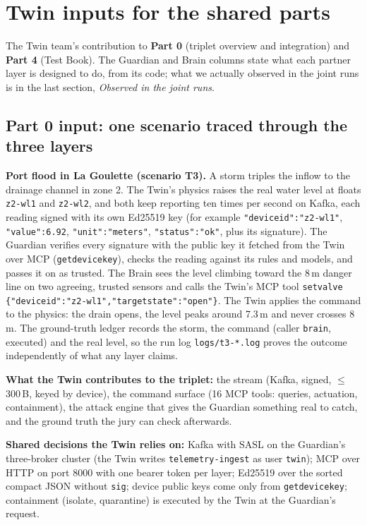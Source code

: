 \documentclass[10pt,a4paper]{article}
\renewcommand{\_}{\textunderscore\allowbreak}
\begin{document}
\section*{Twin inputs for the shared parts}
The Twin team's contribution to \textbf{Part 0} (triplet overview and integration) and \textbf{Part 4} (Test Book). The Guardian and Brain columns state what each partner layer is designed to do, from its code; what we actually observed in the joint runs is in the last section, \emph{Observed in the joint runs}.

\subsection*{Part 0 input: one scenario traced through the three layers}
\textbf{Port flood in La Goulette (scenario T3).} A storm triples the inflow to the drainage channel in zone 2. The Twin's physics raises the real water level at floats \texttt{z2-wl1} and \texttt{z2-wl2}, and both keep reporting ten times per second on Kafka, each reading signed with its own Ed25519 key (for example \texttt{"device\_id":"z2-wl1"}, \texttt{"value":6.92}, \texttt{"unit":"meters"}, \texttt{"status":"ok"}, plus its signature). The Guardian verifies every signature with the public key it fetched from the Twin over MCP (\texttt{get\_device\_key}), checks the reading against its rules and models, and passes it on as trusted. The Brain sees the level climbing toward the 8\,m danger line on two agreeing, trusted sensors and calls the Twin's MCP tool \texttt{set\_valve \{"device\_id":"z2-wl1","target\_state":"open"\}}. The Twin applies the command to the physics: the drain opens, the level peaks around 7.3\,m and never crosses 8\,m. The ground-truth ledger records the storm, the command (caller \texttt{brain}, executed) and the real level, so the run log \texttt{logs/t3-*.log} proves the outcome independently of what any layer claims.

\textbf{What the Twin contributes to the triplet:} the stream (Kafka, signed, $\le$ 300\,B, keyed by device), the command surface (16 MCP tools: queries, actuation, containment), the attack engine that gives the Guardian something real to catch, and the ground truth the jury can check afterwards.

\textbf{Shared decisions the Twin relies on:} Kafka with SASL on the Guardian's three-broker cluster (the Twin writes \texttt{telemetry-ingest} as user \texttt{twin}); MCP over HTTP on port 8000 with one bearer token per layer; Ed25519 over the sorted compact JSON without \texttt{sig}; device public keys come only from \texttt{get\_device\_key}; containment (isolate, quarantine) is executed by the Twin at the Guardian's request.
\end{document}
